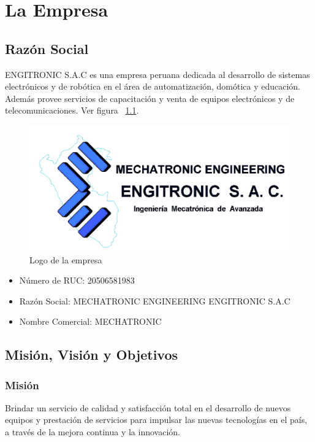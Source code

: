 \chapter{La Empresa}


\section{Razón Social}
ENGITRONIC S.A.C es una empresa peruana dedicada al desarrollo de sistemas electrónicos y de robótica en el área de automatización, domótica y educación. Además provee servicios de capacitación y venta de equipos electrónicos y de telecomunicaciones. Ver figura ~\ref{fig:logo}.

\begin{figure}[h!]
  \centering
  \includegraphics[scale=0.2]{images/engitronic.png}
  \caption{Logo de la empresa}
  \label{fig:logo}
\end{figure}

\begin{itemize}
  \item Número de RUC: 20506581983
  \item Razón Social: MECHATRONIC ENGINEERING ENGITRONIC S.A.C
  \item Nombre Comercial: MECHATRONIC
\end{itemize}


\section{Misión, Visión y Objetivos}

\subsection{Misión}
Brindar un servicio de calidad y satisfacción total en el desarrollo de nuevos equipos y prestación de servicios para impulsar las nuevas tecnologías en el país, a través de la mejora continua y la innovación.

